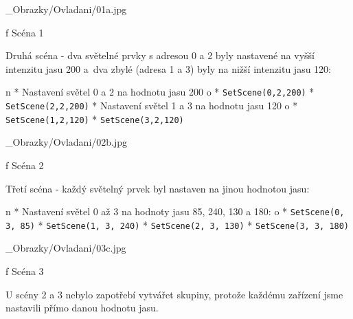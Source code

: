 \medskip {}
\picw=6cm _Obrazky/Ovladani/01a.jpg
\caption/f Scéna 1
\medskip

\noindent
{\sbf Druhá scéna} - dva světelné prvky s adresou 0 a 2 byly nastavené na vyšší intenzitu jasu 200
a~dva zbylé (adresa 1 a 3) byly na nižší intenzitu jasu 120:

\begitems \style n
* {\sbf Nastavení} světel 0 a 2 na hodnotu jasu 200
    \begitems \style o
        * {\tt SetScene(0,2,200)}
        * {\tt SetScene(2,2,200)}
    \enditems
* {\sbf Nastavení} světel 1 a 3 na hodnotu jasu 120
    \begitems \style o
        * {\tt SetScene(1,2,120)}
        * {\tt SetScene(3,2,120)}
    \enditems

\enditems

\medskip {}
\picw=6cm _Obrazky/Ovladani/02b.jpg
\caption/f Scéna 2
\medskip

\noindent
{\sbf Třetí scéna} - každý světelný prvek byl nastaven na jinou hodnotou jasu:


\begitems \style n
* {\sbf Nastavení} světel 0 až 3 na hodnoty jasu 85, 240, 130 a 180:
    \begitems \style o
        * {\tt SetScene(0, 3, 85)}
        * {\tt SetScene(1, 3, 240)}
        * {\tt SetScene(2, 3, 130)}
        * {\tt SetScene(3, 3, 180)}
    \enditems

\enditems

\medskip {}
\picw=6cm _Obrazky/Ovladani/03c.jpg
\caption/f Scéna 3
\medskip

\noindent U scény 2 a 3 nebylo zapotřebí vytvářet skupiny, protože každému zařízení jsme nastavili přímo danou hodnotu jasu.


